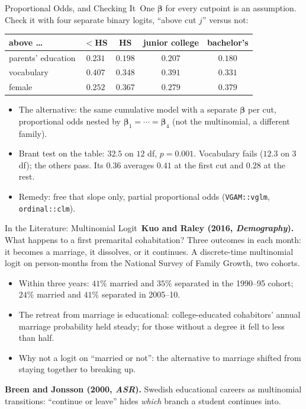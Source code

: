 \documentclass[aspectratio=169,11pt,xcolor=dvipsnames]{beamer}
\newcommand{\core}{\,\raisebox{0.6pt}{\textcolor{corestar}{$\bigstar$}}}
\begin{document}
\begin{frame}{Proportional Odds, and Checking It\core}
One $\bm\beta$ for every cutpoint is an assumption. Check it with four
separate binary logits, ``above cut $j$'' versus not:
\begin{center}\small
\renewcommand{\arraystretch}{1.05}
\begin{tabular}{lcccc}
\toprule
above \dots & $<$HS & HS & junior college & bachelor's \\
\midrule
parents' education & $0.231$ & $0.198$ & $0.207$ & $0.180$ \\
vocabulary & $0.407$ & $0.348$ & $0.391$ & $0.331$ \\
female & $0.252$ & $0.367$ & $0.279$ & $0.379$ \\
\bottomrule
\end{tabular}
\end{center}
\vskip2pt
\begin{itemize}\itemsep1pt
  \item The alternative: the same cumulative model with a separate
        $\bm\beta$ per cut, proportional odds nested by $\bm\beta_1 =
        \cdots = \bm\beta_4$ (not the multinomial, a different family).
  \item Brant test on the table: $32.5$ on $12$ df, $p = 0.001$.
        Vocabulary fails ($12.3$ on $3$ df); the others pass. Its $0.36$
        averages $0.41$ at the first cut and $0.28$ at the rest.
  \item Remedy: free that slope only, partial proportional odds
        (\texttt{VGAM::vglm}, \texttt{ordinal::clm}).
\end{itemize}
\end{frame}

\begin{frame}{In the Literature: Multinomial Logit\core}
\textbf{Kuo and Raley (2016, \emph{Demography}).} What happens to a first
premarital cohabitation? Three outcomes in each month: it becomes a
marriage, it dissolves, or it continues. A discrete-time multinomial logit
on person-months from the National Survey of Family Growth, two cohorts.
\begin{itemize}\itemsep3pt
  \item Within three years: $41\%$ married and $35\%$ separated in the
        1990--95 cohort; $24\%$ married and $41\%$ separated in 2005--10.
  \item The retreat from marriage is educational: college-educated
        cohabitors' annual marriage probability held steady; for those
        without a degree it fell to less than half.
  \item Why not a logit on ``married or not'': the alternative to
        marriage shifted from staying together to breaking up.
\end{itemize}
\vskip2pt
\textbf{Breen and Jonsson (2000, \emph{ASR}).} Swedish educational careers as multinomial transitions: ``continue or
leave'' hides \emph{which} branch a student continues into.
\end{frame}
\end{document}
